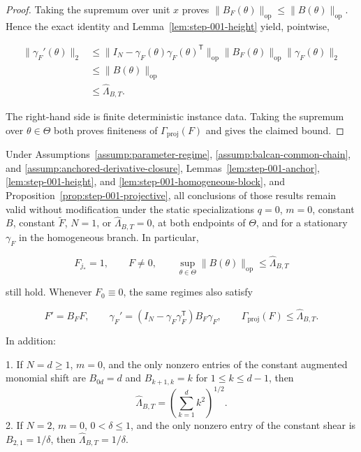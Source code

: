 \begin{proof}
Taking the supremum over unit \(x\) proves
\(\|B_F(\theta)\|_{\mathrm{op}}\leq\|B(\theta)\|_{\mathrm{op}}\). Hence the exact identity and
Lemma~\ref{lem:step-001-height} yield, pointwise,

\begin{equation}
\label{eq:appendix-display-021}
\begin{aligned}
\|\gamma_F'(\theta)\|_2
&\leq
\|I_N-\gamma_F(\theta)\gamma_F(\theta)^{\mathsf T}\|_{\mathrm{op}}
\|B_F(\theta)\|_{\mathrm{op}}
\|\gamma_F(\theta)\|_2\\
&\leq\|B(\theta)\|_{\mathrm{op}}\\
&\leq\widehat\Lambda_{B,T}.
\end{aligned}
\end{equation}

The right-hand side is finite deterministic instance data. Taking the supremum over \(\theta\in\Theta\) both
proves finiteness of \(\Gamma_{\mathrm{proj}}(F)\) and gives the claimed bound. 
\end{proof}

\begin{proposition}
\label{prop:step-001-boundary}

Under Assumptions~\ref{assump:parameter-regime}, \ref{assump:balcan-common-chain}, and
\ref{assump:anchored-derivative-closure}, Lemmas~\ref{lem:step-001-anchor},
\ref{lem:step-001-height}, and \ref{lem:step-001-homogeneous-block}, and
Proposition~\ref{prop:step-001-projective}, all conclusions of those results remain valid without modification
under the static specializations \(q=0\), \(m=0\), constant \(B\), constant \(\widetilde F\), \(N=1\), or
\(\widehat\Lambda_{B,T}=0\), at both endpoints of \(\Theta\), and for a stationary \(\gamma_F\) in the
homogeneous branch. In particular,

\begin{equation}
\label{eq:appendix-display-022}
F_{j_*}=1,
\qquad
F\neq0,
\qquad
\sup_{\theta\in\Theta}\|B(\theta)\|_{\mathrm{op}}
\leq\widehat\Lambda_{B,T}
\end{equation}

still hold. Whenever \(F_0\equiv0\), the same regimes also satisfy

\begin{equation}
\label{eq:appendix-display-023}
F'=B_FF,
\qquad
\gamma_F'=(I_N-\gamma_F\gamma_F^{\mathsf T})B_F\gamma_F,
\qquad
\Gamma_{\mathrm{proj}}(F)\leq\widehat\Lambda_{B,T}.
\end{equation}

In addition:

1. If \(N=d\geq1\), \(m=0\), and the only nonzero entries of the constant augmented monomial shift are
   \(B_{0d}=d\) and \(B_{k+1,k}=k\) for \(1\leq k\leq d-1\), then
\begin{equation}
\label{eq:appendix-indented-001}
   \widehat\Lambda_{B,T}=\left(\sum_{k=1}^d k^2\right)^{1/2}.
\end{equation}
2. If \(N=2\), \(m=0\), \(0<\delta\leq1\), and the only nonzero entry of the constant shear is
   \(B_{2,1}=1/\delta\), then \(\widehat\Lambda_{B,T}=1/\delta\).


\end{proposition}

